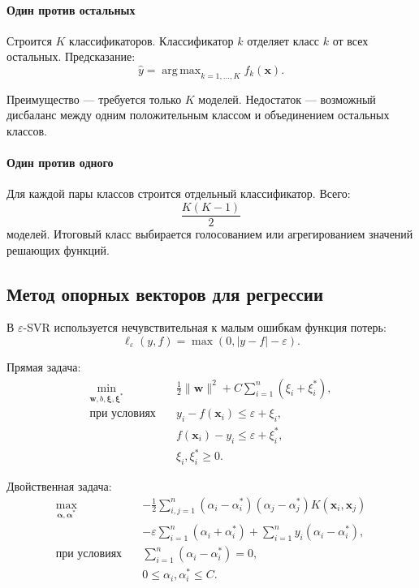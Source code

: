 \documentclass[12pt,a4paper]{article}
\theoremstyle{definition}
\newcommand{\1}{\mathbf{1}}
\newcommand{\eps}{\varepsilon}
\DeclareMathOperator{\argmax}{arg\,max}
\begin{document}
\paragraph{Один против остальных}

Строится $K$ классификаторов. Классификатор $k$ отделяет класс $k$
от всех остальных. Предсказание:
\[
    \widehat{y}
    =
    \argmax_{k=1,\ldots,K}f_k(\bm{x}).
\]

Преимущество --- требуется только $K$ моделей. Недостаток ---
возможный дисбаланс между одним положительным классом и объединением
остальных классов.

\paragraph{Один против одного}

Для каждой пары классов строится отдельный классификатор. Всего:
\[
    \frac{K(K-1)}{2}
\]
моделей. Итоговый класс выбирается голосованием или агрегированием
значений решающих функций.

\subsection{Метод опорных векторов для регрессии}

В $\eps$-SVR используется нечувствительная к малым ошибкам функция
потерь:
\[
    \ell_{\eps}(y,f)
    =
    \max(0,|y-f|-\eps).
\]

Прямая задача:
\[
\begin{aligned}
    \min_{\bm{w},b,\bm{\xi},\bm{\xi}^{*}}
    \quad&
    \frac{1}{2}\|\bm{w}\|^2
    +
    C\sum_{i=1}^{n}(\xi_i+\xi_i^{*}),\\
    \text{при условиях}\quad&
    y_i-f(\bm{x}_i)\leq\eps+\xi_i,\\
    &
    f(\bm{x}_i)-y_i\leq\eps+\xi_i^{*},\\
    &
    \xi_i,\xi_i^{*}\geq0.
\end{aligned}
\]

Двойственная задача:
\[
\begin{aligned}
    \max_{\bm{\alpha},\bm{\alpha}^{*}}
    \quad&
    -\frac{1}{2}
    \sum_{i,j=1}^{n}
    (\alpha_i-\alpha_i^{*})
    (\alpha_j-\alpha_j^{*})
    K(\bm{x}_i,\bm{x}_j)\\
    &-
    \eps\sum_{i=1}^{n}
    (\alpha_i+\alpha_i^{*})
    +
    \sum_{i=1}^{n}
    y_i(\alpha_i-\alpha_i^{*}),\\
    \text{при условиях}\quad&
    \sum_{i=1}^{n}(\alpha_i-\alpha_i^{*})=0,\\
    &
    0\leq\alpha_i,\alpha_i^{*}\leq C.
\end{aligned}
\]
\end{document}
